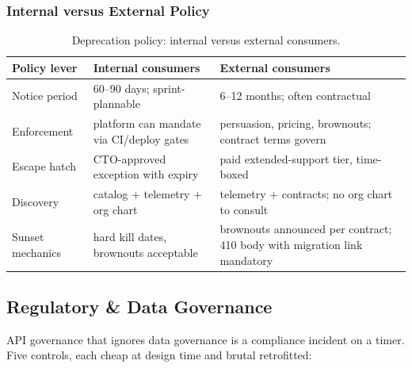 \subsubsection{Internal versus External Policy}
\begin{table}[htbp]
\centering\small
\begin{tabularx}{\textwidth}{l X X}
\toprule
\textbf{Policy lever} & \textbf{Internal consumers} & \textbf{External consumers} \\
\midrule
Notice period & 60--90 days; sprint-plannable & 6--12 months; often contractual \\
Enforcement & platform can mandate via CI/deploy gates & persuasion, pricing, brownouts; contract terms govern \\
Escape hatch & CTO-approved exception with expiry & paid extended-support tier, time-boxed \\
Discovery & catalog + telemetry + org chart & telemetry + contracts; no org chart to consult \\
Sunset mechanics & hard kill dates, brownouts acceptable & brownouts announced per contract; 410 body with migration link mandatory \\
\bottomrule
\end{tabularx}
\caption{Deprecation policy: internal versus external consumers.}
\label{tab:ch20-internal-external}
\end{table}

\subsection{Regulatory \& Data Governance}
\label{sec:ch20-datagov}

API governance that ignores data governance is a compliance incident on a
timer. Five controls, each cheap at design time and brutal retrofitted:

